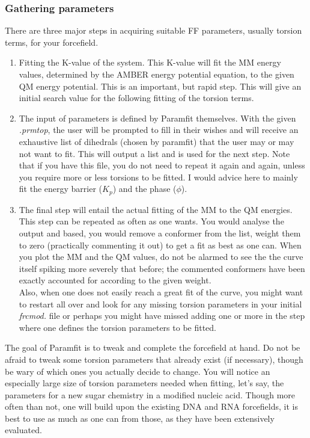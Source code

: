 \documentclass[a4paper]{article}
\begin{document}
\subsubsection{Gathering parameters}
There are three major steps in acquiring suitable FF parameters, usually torsion terms, for your forcefield.
\begin{enumerate}
    \item Fitting the K-value of the system. This K-value will fit the MM energy values, determined by the AMBER energy potential equation, to the given QM energy potential. This is an important, but rapid step. This will give an initial search value for the following fitting of the torsion terms.
    \item The input of parameters is defined by Paramfit themselves. With the given \textit{.prmtop}, the user will be prompted to fill in their wishes and will receive an exhaustive list of dihedrals (chosen by paramfit) that the user may or may not want to fit. This will output a list and is used for the next step. Note that if you have this file, you do not need to repeat it again and again, unless you require more or less torsions to be fitted. I would advice here to mainly fit the energy barrier ($K_p$) and the phase ($\phi$).
    \item The final step will entail the actual fitting of the MM to the QM energies. This step can be repeated as often as one wants. You would analyse the output and based, you would remove a conformer from the list, weight them to zero (practically commenting it out) to get a fit as best as one can. When you plot the MM and the QM values, do not be alarmed to see the the curve itself spiking more severely that before; the commented conformers have been exactly accounted for according to the given weight. \\
        Also, when one does not easily reach a great fit of the curve, you might want to restart all over and look for any missing torsion parameters in your initial \textit{frcmod.} file or perhaps you might have missed adding one or more in the step where one defines the torsion parameters to be fitted.
\end{enumerate}
The goal of Paramfit is to tweak and complete the forcefield at hand. Do not be afraid to tweak some torsion parameters that already exist (if necessary), though be wary of which ones you actually decide to change. You will notice an especially large size of torsion parameters needed when fitting, let's say, the parameters for a new sugar chemistry in a modified nucleic acid. Though more often than not, one will build upon the existing DNA and RNA forcefields, it is best to use as much as one can from those, as they have been extensively evaluated.\\
\end{document}
